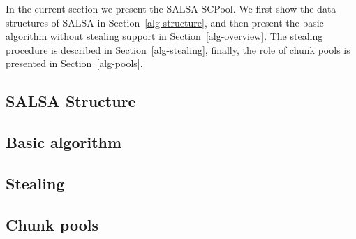 In the current section we present the SALSA SCPool. We first show the data structures of SALSA in Section~\ref{alg-structure}, and then present the basic algorithm without stealing support in Section~\ref{alg-overview}. The stealing procedure is described in Section~\ref{alg-stealing}, finally, the role of chunk pools is presented in Section~\ref{alg-pools}.

\subsection{SALSA Structure\label{alg-structure}}

\subsection{Basic algorithm\label{alg-overview}}

\subsection{Stealing\label{alg-stealing}}

\subsection{Chunk pools\label{alg-pools}}
